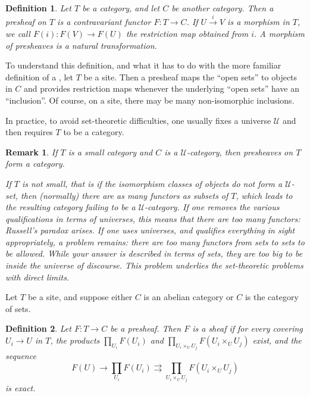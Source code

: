 \documentclass[12pt]{article}
\newtheorem{defn}{Definition}
\newtheorem{rem}{Remark}
\begin{document}
\begin{defn}
Let $T$ be a category, and let $C$ be another category.  Then a \emph{presheaf on $T$} is a contravariant functor $F:T\to C$.  If $U\overset{i}{\to} V$ is a morphism in $T$, we call $F(i):F(V)\to F(U)$ the \emph{restriction map} obtained from $i$.  A \emph{morphism of presheaves} is a natural transformation. 
\end{defn}

To understand this definition, and what it has to do with the more familiar definition of a , let $T$ be a site.  Then a presheaf maps the ``open sets'' to objects in $C$ and provides restriction maps whenever the underlying ``open sets'' have an ``inclusion''.  Of course, on a site, there may be many non-isomorphic inclusions.  

In practice, to avoid set-theoretic difficulties, one usually fixes a universe $\mathcal{U}$ and then requires $T$ to be a  category. 

\begin{rem}
If $T$ is a small category and $C$ is a $\mathcal{U}$-category, then presheaves on $T$ form a category.  

If $T$ is not small, that is if the isomorphism classes of objects do not form a $\mathcal{U}$-set, then (normally) there are as many functors as subsets of $T$, which leads to the resulting category failing to be a $\mathcal{U}$-category.  If one removes the various qualifications in terms of universes, this means that there are too many functors: Russell's paradox arises.  If one uses universes, and qualifies everything in sight appropriately, a problem remains: there are too many functors from sets to sets to be allowed.  While your answer is described in terms of sets, they are too big to be inside the universe of discourse.  This problem underlies the set-theoretic problems with direct limits. 
\end{rem}

Let $T$ be a site, and suppose either $C$ is an abelian category or $C$ is the category of sets.

\begin{defn}
Let $F\colon T\to C$ be a presheaf.  Then $F$ is a \emph{sheaf} if for every covering ${U_i\to U}$ in $T$, the products $\prod_{U_i} F(U_i)$ and $\prod_{U_i \times_U U_j} F(U_i \times_U U_j)$ exist, and the sequence
\[
F(U)\to \prod_{U_i} F(U_i) \rightrightarrows \prod_{U_i \times_U U_j} F(U_i \times_U U_j)
\]
is exact.
\end{defn}
\end{document}
